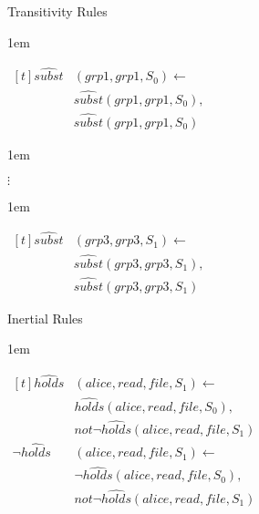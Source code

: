 \documentclass[global,twocolumn,final]{svjour}
\newenvironment{vexample}
  {\begin{example}\hspace{0.25em}}
  {\end{example}}
\newenvironment{vquote}
  {\begin{list}{}{\leftmargin 1em}\item[]}
  {\end{list}}
\begin{document}
\begin{vexample}
\begin{enumerate}
            \item
              Transitivity Rules

              \begin{vquote}
                \begin{math}
                  \begin{aligned}[t]
                    \hat{subst}&(grp1, grp1, S_{0}) \leftarrow \\
                    & \hat{subst}(grp1, grp1, S_{0}), \\
                    & \hat{subst}(grp1, grp1, S_{0})
                  \end{aligned}
                \end{math}
              \end{vquote}

              \begin{vquote}
                \hspace{5em}$\vdots$
              \end{vquote}

              \begin{vquote}
                \begin{math}
                  \begin{aligned}[t]
                    \hat{subst}&(grp3, grp3, S_{1}) \leftarrow \\
                    & \hat{subst}(grp3, grp3, S_{1}), \\
                    & \hat{subst}(grp3, grp3, S_{1})
                  \end{aligned}
                \end{math}
              \end{vquote}

            \item
              Inertial Rules

              \begin{vquote}
                \begin{math}
                  \begin{aligned}[t]
                    \hat{holds}&(alice, read, file, S_{1}) \leftarrow \\
                    & \hat{holds}(alice, read, file, S_{0}), \\
                    & not \lnot \hat{holds}(alice, read, file, S_{1}) \\
                    \lnot \hat{holds}&(alice, read, file, S_{1}) \leftarrow \\
                    & \lnot \hat{holds}(alice, read, file, S_{0}), \\
                    & not \lnot \hat{holds}(alice, read, file, S_{1})
                  \end{aligned}
                \end{math}
              \end{vquote}


\end{enumerate}
\end{vexample}
\end{document}
